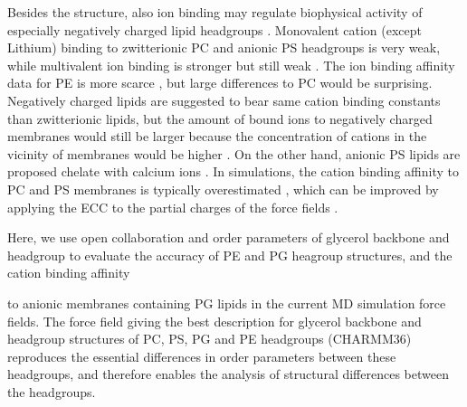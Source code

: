 \documentclass[aps,prl,superscriptaddress,twocolumn]{revtex4}
\begin{document}
Besides the structure, also ion binding may regulate biophysical activity of especially negatively
charged lipid headgroups \cite{seelig90}. Monovalent cation (except Lithium) binding to zwitterionic PC and anionic PS headgroups is
very weak, while multivalent ion binding is stronger but still weak \cite{cevc90,tocanne90,roux90,catte16,antila19}. The ion binding affinity
data for PE is more scarce \cite{marra85}, but large differences to PC would be surprising.
Negatively charged lipids are suggested to bear same cation binding constants than zwitterionic lipids, but
the amount of bound ions to negatively charged membranes would still be larger because
the concentration of cations in the vicinity of membranes would be higher  \cite{seelig90}.
On the other hand, anionic PS lipids are proposed chelate with calcium ions \cite{hauser85,feigenson86,roux91}.
In simulations, the cation binding affinity to PC and PS membranes is typically overestimated \cite{catte16,antila19},
which can be improved by applying the ECC to the partial charges of the force fields \cite{melcr18,melcr19}.

Here, we use open collaboration and order parameters of glycerol backbone and headgroup
to evaluate the accuracy of PE and PG heagroup structures, and the cation binding affinity

to anionic membranes containing PG lipids in the current MD simulation force fields.
The force field giving the best description for glycerol backbone and headgroup structures
of PC, PS, PG and PE headgroups (CHARMM36) reproduces the essential differences in order parameters
between these headgroups, and therefore enables the analysis of structural differences between the
headgroups.
\end{document}

